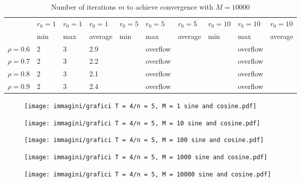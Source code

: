 \documentclass[a4paper,11pt,openright]{report}
\begin{document}
\begin{table}[H]
\centering
\addtolength{\leftskip}{-1.5cm}
\addtolength{\rightskip}{-1.5cm}
\begin{tabular}{|c|lllllllll|}
\hline
$ $ & $r_0 = 1$ & $r_0 = 1$ & $r_0 = 1$ & $r_0 = 5$ & $r_0 = 5$ & $r_0 = 5$ & $r_0 = 10$ & $r_0 = 10$ & $r_0 = 10$  \\
$ $ & min & max & average & min & max & average & min & max & average \\ 
\hline
$\rho = 0.6$ & 2 & 3 & 2.9 &  & overflow &  &  & overflow &  \\

$\rho = 0.7$ & 2 & 3 & 2.2 &  & overflow &  &  & overflow &  \\

$\rho = 0.8$ & 2 & 3 & 2.1 &  & overflow &  &  & overflow & \\

$\rho = 0.9$ & 2 & 3 & 2.4 &  & overflow &  &  & overflow & \\
\hline
\end{tabular}
\caption{Number of iterations $m$ to achieve convergence with $M = 10000$}
\end{table}
\begin{figure}[H]
\centering
\texttt{[image: immagini/grafici T = 4/n = 5, M = 1 sine and cosine.pdf]}
\end{figure}
\begin{figure}[H]
\centering
\texttt{[image: immagini/grafici T = 4/n = 5, M = 10 sine and cosine.pdf]}
\end{figure}
\begin{figure}[H]
\centering
\texttt{[image: immagini/grafici T = 4/n = 5, M = 100 sine and cosine.pdf]}
\end{figure}
\begin{figure}[H]
\centering
\texttt{[image: immagini/grafici T = 4/n = 5, M = 1000 sine and cosine.pdf]}
\end{figure}
\begin{figure}[H]
\centering
\texttt{[image: immagini/grafici T = 4/n = 5, M = 10000 sine and cosine.pdf]}
\end{figure}
\newpage
\end{document}
